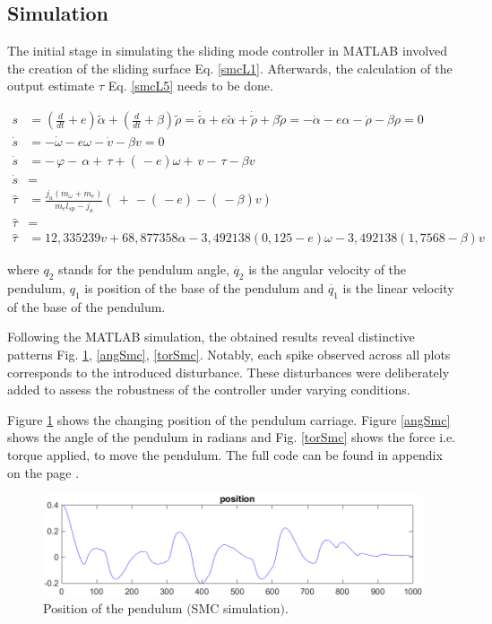 \subsection{Simulation}

The initial stage in simulating the sliding mode controller in MATLAB involved the creation of the sliding surface Eq. \ref{smcL1}. Afterwards, the calculation of the output estimate $\tau$ Eq. \ref{smcL5} needs to be done. 

\begin{align}
s &= (\frac{d}{dt}+e)\tilde{\alpha }+(\frac{d}{dt}+\beta )\tilde{\rho}=\dot{\tilde{\alpha }}+e\tilde{\alpha }+\dot{\tilde{\rho }}+\beta \tilde{\rho }=-\dot{\alpha }-e\alpha -\dot{\rho }-\beta \rho =0 \label{smcL1}\\
\dot{s} &=-\dot{\omega }-e\omega -\dot{v}-\beta v=0 \label{smcL2}\\
\dot{s} &=-\frac{}{}\varphi -\frac{}{}\alpha +\frac{}{}\tau +(\frac{}{}-e)\omega +\frac{}{}v-\frac{}{}\tau -\beta v \label{smcL3}\\
\dot{s} &= \label{smcL4}\\
\hat{\tau } &=\frac{j_a(m_\omega +m_e)}{m_el_{sp}-j_a}\left ( \frac{}{}+\frac{}{}-(\frac{}{}-e) -(\frac{}{}-\beta )v\right ) \label{smcL5}\\
\hat{\tau } &= \nonumber\\
\hat{\tau } &=12,335239v+68,877358\alpha -3,492138(0,125-e)\omega -3,492138(1,7568-\beta )v \nonumber
\end{align}

where $q_2$ stands for the pendulum angle, $\dot{q_2}$ is the angular velocity of the pendulum, $q_1$ is position of the base of the pendulum and $\dot{q_1}$ is the linear velocity of the base of the pendulum.

Following the MATLAB simulation, the obtained results reveal distinctive patterns Fig. \ref{posSmc}, \ref{angSmc}, \ref{torSmc}. Notably, each spike observed across all plots corresponds to the introduced disturbance. These disturbances were deliberately added to assess the robustness of the controller under varying conditions.

Figure \ref{posSmc} shows the changing position of the pendulum carriage. Figure \ref{angSmc} shows the angle of the pendulum in radians and Fig. \ref{torSmc} shows the force i.e. torque applied, to move the pendulum. The full code can be found in appendix on the page \pageref{smcSim}.

\begin{figure}[!tbh]
	\centering
	\includegraphics[width=150mm]{obr/posSmc.png}
	\caption{Position of the pendulum $($SMC simulation$)$.}\label{posSmc}
\end{figure}

